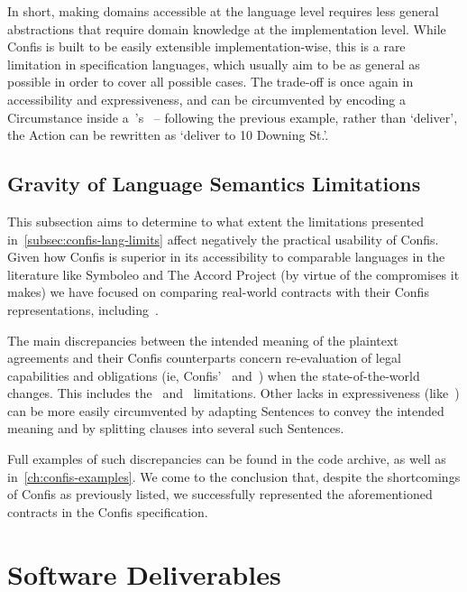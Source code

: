 In short, making domains accessible at the language level requires less general abstractions that require domain knowledge at the implementation level.
While Confis is built to be easily extensible implementation-wise, this is a rare limitation in specification languages, which usually aim to be as general as possible in order to cover all possible cases.
The trade-off is once again in accessibility and expressiveness, and can be circumvented by encoding a Circumstance inside a~'s~ -- following the previous example, rather than `deliver', the Action can be rewritten as `deliver to 10 Downing St.'.

\subsection{Gravity of Language Semantics Limitations}\label{subsec:gravity--lang-limits}

This subsection aims to determine to what extent the limitations presented in~\autoref{subsec:confis-lang-limits} affect negatively the practical usability of Confis.
Given how Confis is superior in its accessibility to comparable languages in the literature like Symboleo and The Accord Project (by virtue of the compromises it makes) we have focused on comparing real-world contracts with their Confis representations, including~\cite{economistIU2016licence, symboleoMeat, jetbrainsToolbox, seismicDataLicence}.

The main discrepancies between the intended meaning of the plaintext agreements and their Confis counterparts concern re-evaluation of legal capabilities and obligations (ie, Confis'~ and~) when the state-of-the-world changes.
This includes the~ and~ limitations.
Other lacks in expressiveness (like~) can be more easily circumvented by adapting Sentences to convey the intended meaning and by splitting clauses into several such Sentences.

Full examples of such discrepancies can be found in the code archive, as well as in~\autoref{ch:confis-examples}.
We come to the conclusion that, despite the shortcomings of Confis as previously listed, we successfully represented the aforementioned contracts in the Confis specification.



\section{Software Deliverables}\label{sec:software-deliverables}

